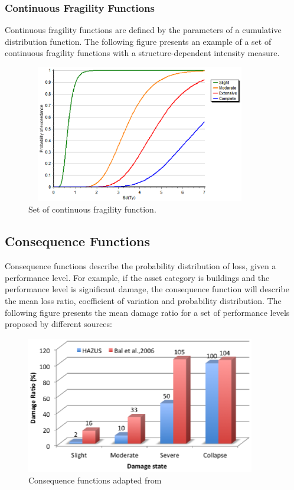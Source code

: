 \subsubsection{Continuous Fragility Functions}
Continuous fragility functions are defined by the parameters of a cumulative distribution function. The following figure presents an example of a set of continuous fragility functions with a structure-dependent intensity measure.

\begin{figure}[ht]
\centering
\includegraphics[width=10cm,height=6cm]{./Figures/Part_Risk/FFContinuous.eps}
\caption{Set of continuous fragility function.}
\label{FFcontinuous}
\end{figure}

\subsection{Consequence Functions}
Consequence functions describe the probability distribution of loss, given a performance level. For example, if the asset category is buildings and the performance level is significant damage, the consequence function will describe the mean loss ratio, coefficient of variation and probability distribution. The following figure presents the mean damage ratio for a set of performance levels proposed by different sources:

\begin{figure}[ht]
\centering
\includegraphics[width=10cm,height=6cm]{./Figures/Part_Risk/ConsequenceFunction.eps}
\caption{Consequence functions adapted from  \citet{Baletal2010}}
\label{ConsequenceFunctions}
\end{figure}

